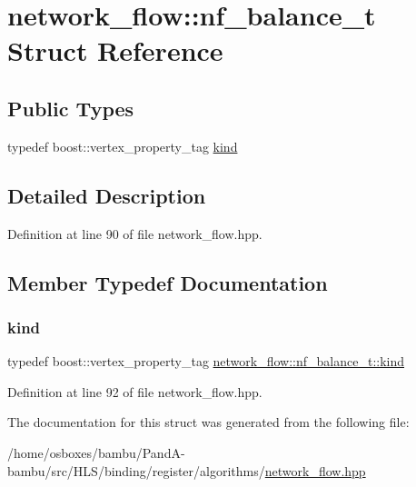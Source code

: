 \hypertarget{structnetwork__flow_1_1nf__balance__t}{}\section{network\+\_\+flow\+:\+:nf\+\_\+balance\+\_\+t Struct Reference}
\label{structnetwork__flow_1_1nf__balance__t}
\subsection*{Public Types}
\begin{DoxyCompactItemize}
\item 
typedef boost\+::vertex\+\_\+property\+\_\+tag \hyperlink{structnetwork__flow_1_1nf__balance__t_af72bb472b23d3f38002c021fed19849e}{kind}
\end{DoxyCompactItemize}


\subsection{Detailed Description}


Definition at line 90 of file network\+\_\+flow.\+hpp.



\subsection{Member Typedef Documentation}
\mbox{\label{structnetwork__flow_1_1nf__balance__t_af72bb472b23d3f38002c021fed19849e}} 
\subsubsection{\texorpdfstring{kind}{kind}}
{\footnotesize\ttfamily typedef boost\+::vertex\+\_\+property\+\_\+tag \hyperlink{structnetwork__flow_1_1nf__balance__t_af72bb472b23d3f38002c021fed19849e}{network\+\_\+flow\+::nf\+\_\+balance\+\_\+t\+::kind}}



Definition at line 92 of file network\+\_\+flow.\+hpp.



The documentation for this struct was generated from the following file\+:\begin{DoxyCompactItemize}
\item 
/home/osboxes/bambu/\+Pand\+A-\/bambu/src/\+H\+L\+S/binding/register/algorithms/\hyperlink{network__flow_8hpp}{network\+\_\+flow.\+hpp}\end{DoxyCompactItemize}
